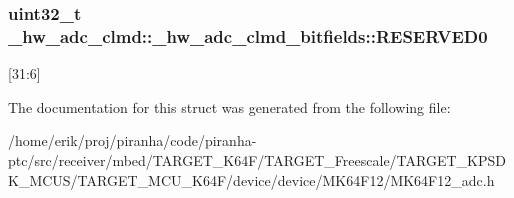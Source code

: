 \subsubsection[{\texorpdfstring{R\+E\+S\+E\+R\+V\+E\+D0}{RESERVED0}}]{\setlength{\rightskip}{0pt plus 5cm}uint32\+\_\+t \+\_\+hw\+\_\+adc\+\_\+clmd\+::\+\_\+hw\+\_\+adc\+\_\+clmd\+\_\+bitfields\+::\+R\+E\+S\+E\+R\+V\+E\+D0}\hypertarget{struct__hw__adc__clmd_1_1__hw__adc__clmd__bitfields_ac84eeb11eb74f514a8cf5aac01ed657e}{}\label{struct__hw__adc__clmd_1_1__hw__adc__clmd__bitfields_ac84eeb11eb74f514a8cf5aac01ed657e}
\mbox{[}31\+:6\mbox{]} 

The documentation for this struct was generated from the following file\+:\begin{DoxyCompactItemize}
\item 
/home/erik/proj/piranha/code/piranha-\/ptc/src/receiver/mbed/\+T\+A\+R\+G\+E\+T\+\_\+\+K64\+F/\+T\+A\+R\+G\+E\+T\+\_\+\+Freescale/\+T\+A\+R\+G\+E\+T\+\_\+\+K\+P\+S\+D\+K\+\_\+\+M\+C\+U\+S/\+T\+A\+R\+G\+E\+T\+\_\+\+M\+C\+U\+\_\+\+K64\+F/device/device/\+M\+K64\+F12/M\+K64\+F12\+\_\+adc.\+h\end{DoxyCompactItemize}
